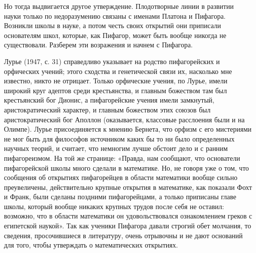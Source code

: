 Но тогда выдвигается другое утверждение. Плодотворные линии в развитии
науки только по недоразумению связаны с именами Платона и Пифагора.
Возникли школы в науке, а потом честь своих открытий они приписали
основателям школ, которые, как Пифагор, может быть вообще никогда не
существовали. Разберем эти возражения и начнем с Пифагора.

Лурье (1947, с. 31) справедливо указывает на родство пифагорейских и
орфических учений; этого сходства и генетической связи их, насколько
мне известно, никто не отрицает. Только орфические учения, по Лурье,
имели широкий круг адептов среди крестьянства, и главным божеством там
был крестьянский бог Дионис, а пифагорейские учения имели замкнутый,
аристократический характер, и главным божеством этих союзов был
аристократический бог Аполлон (оказывается, классовые расслоения были
и на Олимпе). Лурье присоединяется к мнению Бернета, что орфизм с его
мистериями не мог быть для философов источником каких бы то ни было
определенных научных теорий, и считает, что немногим лучше обстоит
дело и с ранним пифагореизмом. На той же странице: «Правда, нам
сообщают, что основатели пифагорейской школы много сделали в
математике. Но, не говоря уже о том, что сообщения об открытиях
пифагорейцев в области математики вообще сильно преувеличены,
действительно крупные открытия в математике, как показали Фохт и
Франк, были сделаны поздними пифагорейцами, а только приписаны главе
школы, который вообще никаких крупных трудов после себя не оставил:
возможно, что в области математики он удовольствовался ознакомлением
греков с египетской наукой». Так как ученики Пифагора давали строгий
обет молчания, то сведения, просочившиеся в литературу, очень
отрывочны и не дают оснований для того, чтобы утверждать о
математических открытиях.


